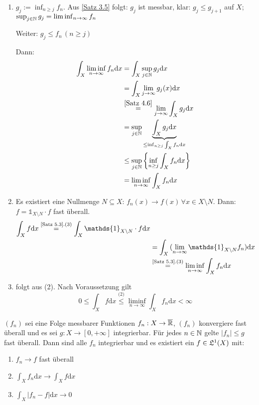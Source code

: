 \documentclass[a4paper,twoside,DIV15,BCOR12mm,chapterprefix=true,headings=onelinechapter]{scrbook}
\begin{document}
\begin{beweis}
\begin{enumerate}
\item \(g_{j}:=\inf_{n\geq j}{f_{n}}\). Aus \ref{Satz 3.5} folgt: \(g_{j}\) ist messbar, klar: \(g_{j}\leq g_{j+1}\) auf
\(X\); \(\sup_{j\in\mathbb{N}}{g_{j}}=\liminf_{n\to\infty}{f_{n}}\)

Weiter: \(g_{j}\leq f_{n}\,(n\geq j)\)

Dann:
\begin{align*}
\int_{X}{\liminf_{n\to\infty}f_{n}\mathrm{d}x}&=\int_{X}{\sup_{j\in\mathbb{N}}g_{j}\mathrm{d}x}\\
&=\int_{X}{\lim_{j\to\infty}g_{j}(x)\mathrm{d}x}\\
&\overset{\ref{Satz 4.6}}{=}\lim_{j\to\infty}\int_{X}{g_{j}\mathrm{d}x}\\
&=\sup_{j\in\mathbb{N}}\underbrace{\int_{X}{g_{j}\mathrm{d}x}}_{\leq\inf_{n\geq j}\int_{X}{f_{n}\mathrm{d}x}}\\
&\leq\sup_{j\in\mathbb{N}}\left\{\inf_{n\geq j}\int_{X}{f_{n}\mathrm{d}x}\right\}\\
&=\liminf_{n\to\infty}\int_{X}{f_{n}\mathrm{d}x}
\end{align*}
\item Es existiert eine Nullmenge \(N\subseteq X\): \(f_{n}(x)\to f(x)\,\forall x\in X\setminus N\). Dann:
\(f=\mathds{1}_{X\setminus N}\cdot f\) fast \"uberall.
\begin{align*}
\int_{X}{f\mathrm{d}x}\overset{\text{\ref{Satz 5.3}.(3)}}{=}\int_{X}{\mathds{1}_{X\setminus N}\cdot f\mathrm{d}x}\\
&=\int_{X}{(\lim_{n\to\infty}\mathds{1}_{X\setminus N}f_{n})\mathrm{d}x}\\
&\overset{\text{\ref{Satz 5.3}.(3)}}{=}\liminf_{n\to\infty}\int_{X}{f_{n}\mathrm{d}x}
\end{align*}
\item folgt aus (2). Nach Voraussetzung gilt 
\[
0\leq\int_{X}{f\mathrm{d}x}\overset{\text{(2)}}{\leq}\liminf_{n\to\infty}\int_{X}{f_{n}\mathrm{d}x}<\infty
\]
\end{enumerate}
\end{beweis}

\begin{satz}
\label{Satz 6.2}
\((f_{n})\) sei eine Folge messbarer Funktionen \(f_{n}:X\to\overline{\mathbb{R}}\), \((f_{n})\)
konvergiere fast \"uberall und es sei \(g:X\to[0,+\infty]\) integrierbar. F\"ur
jedes \(n\in\mathbb{N}\) gelte \(\lvert f_{n}\rvert\leq g\) fast \"uberall. Dann sind
alle \(f_{n}\) integrierbar und es existiert ein \(f\in\mathfrak{L}^{1}(X)\) mit:
\begin{enumerate}
\item \(f_{n}\to f\) fast \"uberall
\item \(\int_{X}{f_{n}\mathrm{d}x}\to\int_{X}{f\mathrm{d}x}\)
\item \(\int_{X}{\lvert f_{n}-f\rvert\mathrm{d}x}\to 0\)
\end{enumerate}
\end{satz}
\end{document}
